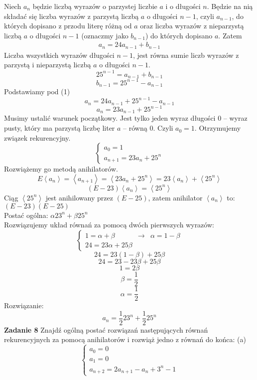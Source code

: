 \documentclass[12pt,a4paper]{article}
\begin{document}
Niech \(a_n\) będzie liczbą wyrazów o parzystej liczbie \(a\) i o długości \(n\). Będzie na nią składać się liczba wyrazów z parzystą liczbą \(a\) o długości \( n - 1 \), czyli \(a_{n - 1}\), do których dopisano z przodu literę różną od \(a\) oraz liczba wyrazów z nieparzystą liczbą \(a\) o długości \( n -1 \) (oznaczmy jako \(b_{n-1}\)) do których dopisano \(a\). Zatem
\begin{gather}
	a_n = 24a_{n-1} + b_{n-1}
\end{gather}
Liczba wszystkich wyrazów długości \(n - 1\), jest równa sumie liczb wyrazów z parzystą i nieparzystą liczbą \(a\) o długości \(n-1\).
\[
	25^{n-1} = a_{n-1} + b_{n-1}
\]
\[
	b_{n-1} = 25^{n-1} - a_{n-1}
\]
Podstawiamy pod (1)
\[
	a_n = 24a_{n-1} + 25^{n-1} - a_{n-1}
\]
\[
	a_n = 23a_{n-1} + 25^{n-1}
\]
Musimy ustalić warunek początkowy. Jest tylko jeden wyraz długości 0 -- wyraz pusty, który ma parzystą liczbę liter \(a\) -- równą 0. Czyli \(a_0 = 1\). Otrzymujemy związek rekurencyjny.
\[
	\left\{ 
	\begin{array}{l}
		a_0 = 1 \\
		a_{n + 1} = 23a_n + 25^n
	\end{array} 
	\right.
\]
Rozwiążemy go metodą anihilatorów.
\[
	E \left< a_n \right> = \left< a_{n+1} \right> 
	= \left< 23a_n + 25^n \right> 
	= 23\left< a_n \right> + \left< 25^n \right>
\]
\[
	(E - 23) \left< a_n \right> = \left< 25^n \right>
\]
Ciąg \( \left< 25^n \right> \) jest anihilowany przez \( (E - 25) \), zatem anihilator \( \left< a_n \right> \) to: 
\( (E - 23)(E - 25)  \) \\
Postać ogólna: \( \alpha 23^n + \beta 25^n \) \\
Rozwiązujemy układ równań za pomocą dwóch pierwszych wyrazów:
\[
	\left\{ 
	\begin{array}{lll}
		1 = \alpha + \beta & \rightarrow & \alpha = 1 - \beta \\
		24 = 23\alpha + 25\beta
	\end{array} 
	\right.
\]
\[
	24 = 23(1 - \beta) + 25\beta
\]
\[
	24 = 23 - 23\beta + 25\beta
\]
\[
	1 = 2\beta
\]
\[
	\beta = \frac{1}{2}
\]
\[
	\alpha = \frac{1}{2}
\]
Rozwiązanie: 
\[
	a_n = \frac{1}{2}23^n + \frac{1}{2}25^n
\]
\newpage
\noindent
\textbf{Zadanie 8} Znajdź ogólną postać rozwiązań następujących równań rekurencyjnych za pomocą anihilatorów i rozwiąż jedno z równań do końca:
\vskip 0.1cm
(a)
\[
	\left\{ 
	\begin{array}{l}
		a_0 = 0 \\
		a_1 = 0 \\
		a_{n + 2} = 2a_{n+1} - a_{n} + 3^n - 1
	\end{array} 
	\right.
\]
\end{document}
